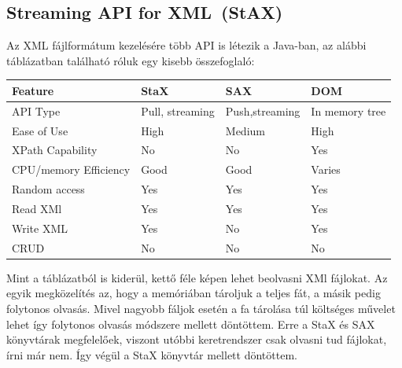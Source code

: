\documentclass{article}
\begin{document}
\subsection{Streaming API for XML (StAX)}\label{subsec:stax}
Az XML fájlformátum kezelésére több API is létezik a Java-ban, az alábbi táblázatban található róluk egy kisebb összefoglaló:
\begin{center}
	\begin{tabular}{ | l | l | l | l | }
		\hline
		Feature & StaX & SAX & DOM \\
		\hline
		API Type & Pull, streaming & Push,streaming & In memory tree \\
		Ease of Use & High & Medium & High \\
		XPath Capability & No & No & Yes \\
		CPU/memory Efficiency & Good & Good & Varies \\
		Random access & Yes & Yes & Yes \\
		Read XMl & Yes & Yes & Yes \\
		Write XML & Yes & No & Yes \\
		CRUD & No & No & No \\
		\hline
	\end{tabular}
\end{center}
Mint a táblázatból is kiderül, kettő féle képen lehet beolvasni XMl fájlokat. Az egyik megközelítés az, hogy a memóriában tároljuk a teljes fát, a másik pedig folytonos olvasás. Mivel nagyobb fáljok esetén a fa tárolása túl költséges művelet lehet így folytonos olvasás módszere mellett döntöttem. Erre a StaX és SAX könyvtárak megfelelőek, viszont utóbbi keretrendszer csak olvasni tud fájlokat, írni már nem. Így végül a StaX könyvtár mellett döntöttem.
\end{document}
